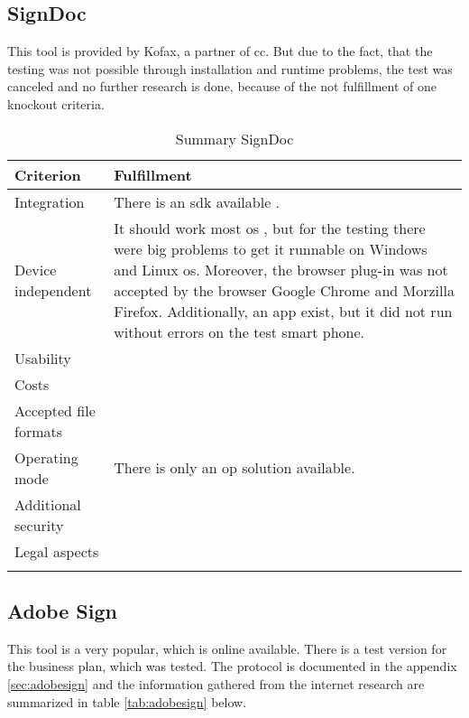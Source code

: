 \subsection{SignDoc}
This tool is provided by Kofax, a partner of \gls{cc}. But due to the fact, that the testing was not possible through installation and runtime problems, the test was canceled and no further research is done, because of the not fulfillment of one knockout criteria. 

	\begin{longtable}{|p{4cm}|p{10cm}|} \hline
		Criterion & Fulfillment \\ \hline
		Integration & There is an \gls{sdk} available \parencite{kofax2018sdk}. \\ \hline
		Device independent & It should work most \gls{os} \parencite{kofax2018sdk}, but for the testing there were big problems to get it runnable on Windows and Linux \gls{os}. Moreover, the browser plug-in was not accepted by the browser Google Chrome and Morzilla Firefox. Additionally, an \gls{app} exist, but it did not run without errors on the test smart phone. \\ \hline
		Usability & \\ \hline
		Costs & \\ \hline
		Accepted file formats & \\ \hline
		Operating mode & There is only an \gls{op} solution available.\\ \hline
		Additional security & \\ \hline
		Legal aspects & \\ \hline
	\caption{Summary SignDoc}
	\label{tab:signdoc}
	\end{longtable}

\subsection{Adobe Sign}
This tool is a very popular, which is online available. There is a test version for the business plan, which was tested. The protocol is documented in the appendix \ref{sec:adobesign} and the information gathered from the internet research are summarized in table \ref{tab:adobesign} below. 
	
